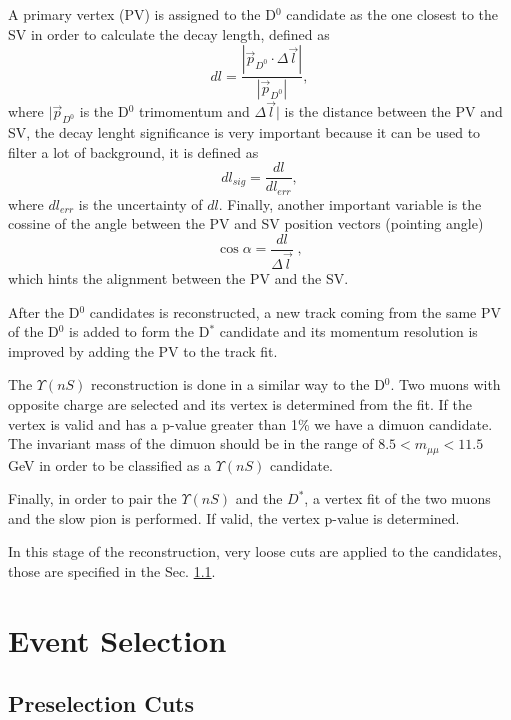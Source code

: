 A primary vertex (PV) is assigned to the D$^0$ candidate as the one closest to the SV in order to calculate the decay length, defined as
\begin{equation}
    dl = \frac{|\Vec{p}_{D^0} \cdot \Delta\Vec{l}|}{|\Vec{p}_{D^0}|},
\end{equation}
where $|\Vec{p}_{D^0}$ is the D$^0$ trimomentum and $\Delta\Vec{l}|$ is the distance between the PV and SV, the decay lenght significance is very important because it can be used to filter a lot of background, it is defined as
\begin{equation}
    dl_{sig} = \frac{dl}{dl_{err}},
\end{equation}
where $dl_{err}$ is the uncertainty of $dl$. Finally, another important variable is the cossine of the angle between the PV and SV position vectors (pointing angle)
\begin{equation}
    \cos{\alpha} = \frac{dl}{\Delta\Vec{l}} \; ,
\end{equation}
which hints the alignment between the PV and the SV.

After the D$^0$ candidates is reconstructed, a new track coming from the same PV of the D$^0$ is added to form the D$^*$ candidate and its momentum resolution is improved by adding the PV to the track fit.

The $\Upsilon(nS)$ reconstruction is done in a similar way to the D$^0$. Two muons with opposite charge are selected and its vertex is determined from the fit. If the vertex is valid and has a p-value greater than 1\% we have a dimuon candidate. The invariant mass of the dimuon should be in the range of $8.5 < m_{\mu\mu} < 11.5$ GeV in order to be classified as a $\Upsilon(nS)$ candidate. 

Finally, in order to pair the $\Upsilon(nS)$ and the $D^*$, a vertex fit of the two muons and the slow pion is performed. If valid, the vertex p-value is determined.

In this stage of the reconstruction, very loose cuts are applied to the candidates, those are specified in the Sec. \ref{sec:preselection}.

\section{Event Selection}

\subsection{Preselection Cuts} \label{sec:preselection}

